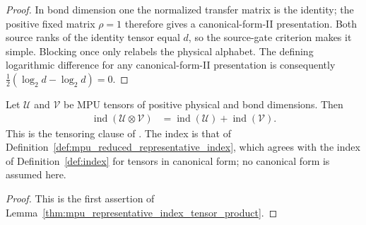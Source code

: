 \begin{proof}\leanok
    In bond dimension one the normalized transfer matrix is the identity;
    the positive fixed matrix $\rho=1$ therefore gives a canonical-form-II
    presentation. Both source ranks of the identity tensor equal $d$, so the
    source-gate criterion makes it simple. Blocking once only relabels the
    physical alphabet. The defining logarithmic difference for any
    canonical-form-II presentation is consequently
    $\frac12(\log_2d-\log_2d)=0$.
\end{proof}

\begin{lemma}
    \label{lem:mpu_index_tensor}
    \leanok
    Let $\mathcal U$ and $\mathcal V$ be MPU tensors of positive physical and
    bond dimensions. Then
    \begin{align}
        \operatorname{ind}(\mathcal U\otimes\mathcal V)
         & =\operatorname{ind}(\mathcal U)+\operatorname{ind}(\mathcal V).
    \end{align}
    This is the tensoring clause of \cite[Theorem~IV.6(ii)]{Cirac2017MPU}.
    The index is that of
    Definition~\ref{def:mpu_reduced_representative_index}, which agrees with
    the index of Definition~\ref{def:index} for tensors in canonical form; no
    canonical form is assumed here.
\end{lemma}

\begin{proof}\leanok
    This is the first assertion of
    Lemma~\ref{thm:mpu_representative_index_tensor_product}.
\end{proof}

